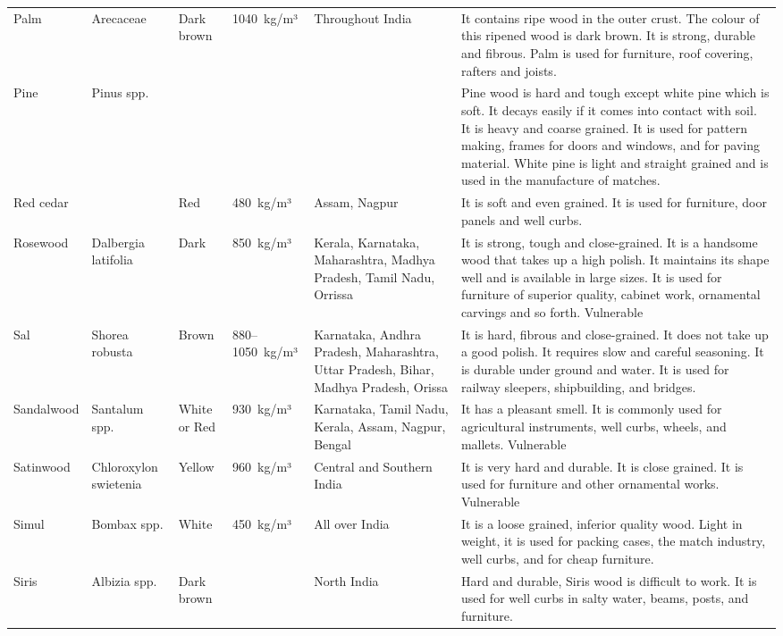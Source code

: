 \documentclass{article}
\begin{document}
\begin{tabular}{llllll}
Palm & Arecaceae & Dark brown & 1040 kg/m³ & Throughout India & It contains ripe wood in the outer crust. The colour of this ripened wood is dark brown. It is strong, durable and fibrous. Palm is used for furniture, roof covering, rafters and joists. \\
Pine & Pinus spp. &  &  &  & Pine wood is hard and tough except white pine which is soft. It decays easily if it comes into contact with soil. It is heavy and coarse grained. It is used for pattern making, frames for doors and windows, and for paving material. White pine is light and straight grained and is used in the manufacture of matches. \\
Red cedar &  & Red & 480 kg/m³ & Assam, Nagpur & It is soft and even grained. It is used for furniture, door panels and well curbs. \\
Rosewood & Dalbergia latifolia & Dark & 850 kg/m³ & Kerala, Karnataka, Maharashtra, Madhya Pradesh, Tamil Nadu, Orrissa & It is strong, tough and close-grained. It is a handsome wood that takes up a high polish. It maintains its shape well and is available in large sizes. It is used for furniture of superior quality, cabinet work, ornamental carvings and so forth. Vulnerable \\
Sal & Shorea robusta & Brown & 880–1050 kg/m³ & Karnataka, Andhra Pradesh, Maharashtra, Uttar Pradesh, Bihar, Madhya Pradesh, Orissa & It is hard, fibrous and close-grained. It does not take up a good polish. It requires slow and careful seasoning. It is durable under ground and water. It is used for railway sleepers, shipbuilding, and bridges. \\
Sandalwood & Santalum spp. & White or Red & 930 kg/m³ & Karnataka, Tamil Nadu, Kerala, Assam, Nagpur, Bengal & It has a pleasant smell. It is commonly used for agricultural instruments, well curbs, wheels, and mallets. Vulnerable \\
Satinwood & Chloroxylon swietenia & Yellow & 960 kg/m³ & Central and Southern India & It is very hard and durable. It is close grained. It is used for furniture and other ornamental works. Vulnerable \\
Simul & Bombax spp. & White & 450 kg/m³ & All over India & It is a loose grained, inferior quality wood. Light in weight, it is used for packing cases, the match industry, well curbs, and for cheap furniture. \\
Siris & Albizia spp. & Dark brown &  & North India & Hard and durable, Siris wood is difficult to work. It is used for well curbs in salty water, beams, posts, and furniture. \\

\end{tabular}
\end{document}
